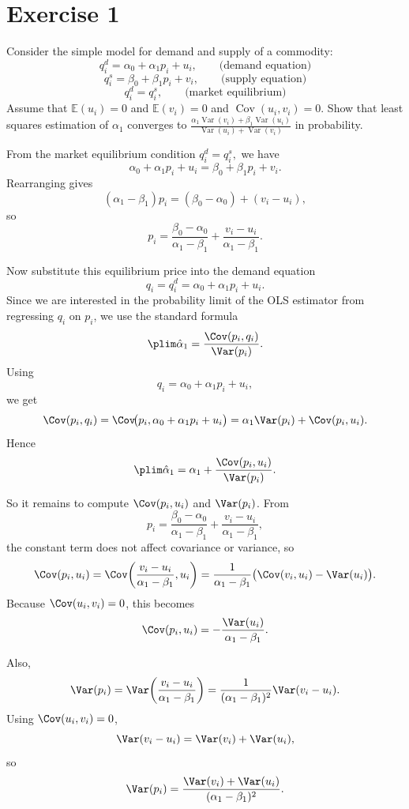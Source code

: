 \documentclass[12pt, letterpaper, onecolumn]{exam}
\begin{document}
\section*{Exercise 1}
Consider the simple model for demand and supply of a commodity:
$$q_i^d=\alpha_0+\alpha_1 p_i+u_i, \qquad \text{(demand equation)}$$
$$q_i^s=\beta_0+\beta_1 p_i+v_i, \qquad \text{(supply equation)}$$
$$q_i^d=q_i^s, \qquad \text{(market equilibrium)}$$
Assume that $\mathbb{E}(u_i)=0$ and $\mathbb{E}(v_i)=0$ and $\operatorname{Cov}(u_i,v_i)=0$. Show that least squares estimation of $\alpha_1$ converges to $\frac{\alpha_1 \operatorname{Var}(v_i)+\beta_1 \operatorname{Var}(u_i)}{\operatorname{Var}(u_i)+\operatorname{Var}(v_i)}$ in probability.

\begin{solution}
    From the market equilibrium condition $q_i^d=q_i^s,$
    we have
    $$
        \alpha_0+\alpha_1 p_i+u_i=\beta_0+\beta_1 p_i+v_i.
    $$
    Rearranging gives
    $$
        (\alpha_1-\beta_1)p_i=(\beta_0-\alpha_0)+(v_i-u_i),
    $$
    so
    $$
        p_i=\frac{\beta_0-\alpha_0}{\alpha_1-\beta_1}+\frac{v_i-u_i}{\alpha_1-\beta_1}.
    $$

    Now substitute this equilibrium price into the demand equation
    $$
        q_i=q_i^d=\alpha_0+\alpha_1 p_i+u_i.
    $$
    Since we are interested in the probability limit of the OLS estimator from regressing $q_i$ on $p_i$, we use the standard formula
    $$
        \plim \hat\alpha_1
        =
        \frac{\Cov(p_i,q_i)}{\Var(p_i)}.
    $$
    Using
    $$
        q_i=\alpha_0+\alpha_1 p_i+u_i,
    $$
    we get
    $$
        \Cov(p_i,q_i)
        =
        \Cov\!\bigl(p_i,\alpha_0+\alpha_1 p_i+u_i\bigr)
        =
        \alpha_1\Var(p_i)+\Cov(p_i,u_i).
    $$
    Hence
    $$
        \plim \hat\alpha_1
        =
        \alpha_1+\frac{\Cov(p_i,u_i)}{\Var(p_i)}.
    $$

    So it remains to compute $\Cov(p_i,u_i)$ and $\Var(p_i)$. From
    $$
        p_i=\frac{\beta_0-\alpha_0}{\alpha_1-\beta_1}+\frac{v_i-u_i}{\alpha_1-\beta_1},
    $$
    the constant term does not affect covariance or variance, so
    $$
        \Cov(p_i,u_i)
        =
        \Cov\!\left(\frac{v_i-u_i}{\alpha_1-\beta_1},u_i\right)
        =
        \frac{1}{\alpha_1-\beta_1}\bigl(\Cov(v_i,u_i)-\Var(u_i)\bigr).
    $$
    Because $\Cov(u_i,v_i)=0$, this becomes
    $$
        \Cov(p_i,u_i)
        =
        -\frac{\Var(u_i)}{\alpha_1-\beta_1}.
    $$

    Also,
    $$
        \Var(p_i)
        =
        \Var\!\left(\frac{v_i-u_i}{\alpha_1-\beta_1}\right)
        =
        \frac{1}{(\alpha_1-\beta_1)^2}\Var(v_i-u_i).
    $$
    Using $\Cov(u_i,v_i)=0$,
    $$
        \Var(v_i-u_i)=\Var(v_i)+\Var(u_i),
    $$
    so
    $$
        \Var(p_i)
        =
        \frac{\Var(v_i)+\Var(u_i)}{(\alpha_1-\beta_1)^2}.
    $$


\end{solution}
\end{document}
